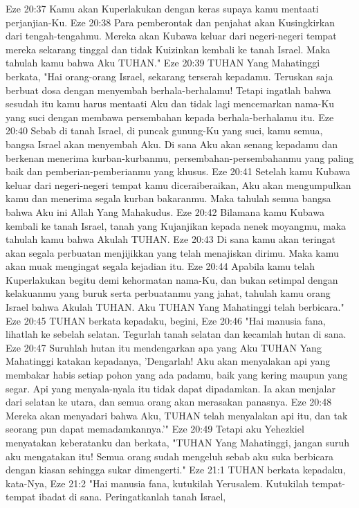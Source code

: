 Eze 20:37  Kamu akan Kuperlakukan dengan keras supaya kamu mentaati perjanjian-Ku.
Eze 20:38  Para pemberontak dan penjahat akan Kusingkirkan dari tengah-tengahmu. Mereka akan Kubawa keluar dari negeri-negeri tempat mereka sekarang tinggal dan tidak Kuizinkan kembali ke tanah Israel. Maka tahulah kamu bahwa Aku TUHAN."
Eze 20:39  TUHAN Yang Mahatinggi berkata, "Hai orang-orang Israel, sekarang terserah kepadamu. Teruskan saja berbuat dosa dengan menyembah berhala-berhalamu! Tetapi ingatlah bahwa sesudah itu kamu harus mentaati Aku dan tidak lagi mencemarkan nama-Ku yang suci dengan membawa persembahan kepada berhala-berhalamu itu.
Eze 20:40  Sebab di tanah Israel, di puncak gunung-Ku yang suci, kamu semua, bangsa Israel akan menyembah Aku. Di sana Aku akan senang kepadamu dan berkenan menerima kurban-kurbanmu, persembahan-persembahanmu yang paling baik dan pemberian-pemberianmu yang khusus.
Eze 20:41  Setelah kamu Kubawa keluar dari negeri-negeri tempat kamu diceraiberaikan, Aku akan mengumpulkan kamu dan menerima segala kurban bakaranmu. Maka tahulah semua bangsa bahwa Aku ini Allah Yang Mahakudus.
Eze 20:42  Bilamana kamu Kubawa kembali ke tanah Israel, tanah yang Kujanjikan kepada nenek moyangmu, maka tahulah kamu bahwa Akulah TUHAN.
Eze 20:43  Di sana kamu akan teringat akan segala perbuatan menjijikkan yang telah menajiskan dirimu. Maka kamu akan muak mengingat segala kejadian itu.
Eze 20:44  Apabila kamu telah Kuperlakukan begitu demi kehormatan nama-Ku, dan bukan setimpal dengan kelakuanmu yang buruk serta perbuatanmu yang jahat, tahulah kamu orang Israel bahwa Akulah TUHAN. Aku TUHAN Yang Mahatinggi telah berbicara."
Eze 20:45  TUHAN berkata kepadaku, begini,
Eze 20:46  "Hai manusia fana, lihatlah ke sebelah selatan. Tegurlah tanah selatan dan kecamlah hutan di sana.
Eze 20:47  Suruhlah hutan itu mendengarkan apa yang Aku TUHAN Yang Mahatinggi katakan kepadanya, 'Dengarlah! Aku akan menyalakan api yang membakar habis setiap pohon yang ada padamu, baik yang kering maupun yang segar. Api yang menyala-nyala itu tidak dapat dipadamkan. Ia akan menjalar dari selatan ke utara, dan semua orang akan merasakan panasnya.
Eze 20:48  Mereka akan menyadari bahwa Aku, TUHAN telah menyalakan api itu, dan tak seorang pun dapat memadamkannya.'"
Eze 20:49  Tetapi aku Yehezkiel menyatakan keberatanku dan berkata, "TUHAN Yang Mahatinggi, jangan suruh aku mengatakan itu! Semua orang sudah mengeluh sebab aku suka berbicara dengan kiasan sehingga sukar dimengerti."
Eze 21:1  TUHAN berkata kepadaku, kata-Nya,
Eze 21:2  "Hai manusia fana, kutukilah Yerusalem. Kutukilah tempat-tempat ibadat di sana. Peringatkanlah tanah Israel,
